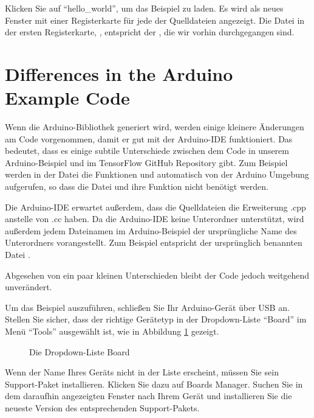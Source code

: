 Klicken Sie auf ``hello\_world'', um das Beispiel zu laden. Es wird als neues Fenster mit einer Registerkarte für jede der Quelldateien angezeigt. Die Datei in der ersten Registerkarte, , entspricht der , die wir vorhin durchgegangen sind.
 
\section{Differences in the Arduino Example Code}
     
Wenn die Arduino-Bibliothek generiert wird, werden einige kleinere Änderungen am Code vorgenommen, damit er gut mit der Arduino-IDE funktioniert. Das bedeutet, dass es einige subtile Unterschiede zwischen dem Code in unserem Arduino-Beispiel und im TensorFlow GitHub Repository gibt. Zum Beispiel werden in der Datei  die Funktionen  und  automatisch von der Arduino Umgebung aufgerufen, so dass die Datei  und ihre Funktion  nicht benötigt werden.

Die Arduino-IDE erwartet außerdem, dass die Quelldateien die Erweiterung .cpp anstelle von .cc haben. Da die Arduino-IDE keine Unterordner unterstützt, wird außerdem jedem Dateinamen im Arduino-Beispiel der ursprüngliche Name des Unterordners vorangestellt. Zum Beispiel entspricht  der ursprünglich benannten Datei .

Abgesehen von ein paar kleinen Unterschieden bleibt der Code jedoch weitgehend unverändert.
 
Um das Beispiel auszuführen, schließen Sie Ihr Arduino-Gerät über USB an. Stellen Sie sicher, dass der richtige Gerätetyp in der Dropdown-Liste ``Board'' im Menü ``Tools'' ausgewählt ist, wie in Abbildung \ref{fig:ArduSelectBoard} gezeigt. 	
 	
\begin{figure}
    \centering
    
    \caption{Die Dropdown-Liste Board}\label{fig:ArduSelectBoard}
\end{figure}     
     
Wenn der Name Ihres Geräts nicht in der Liste erscheint, müssen Sie sein Support-Paket installieren. Klicken Sie dazu auf Boards Manager. Suchen Sie in dem daraufhin angezeigten Fenster nach Ihrem Gerät und installieren Sie die neueste Version des entsprechenden Support-Pakets.

